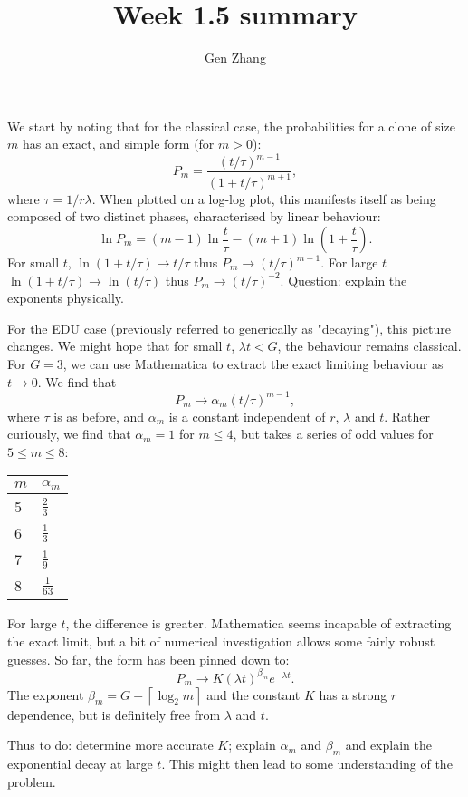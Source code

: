\documentclass[10pt,english]{article}
\begin{document}
\title{Week 1.5 summary}
\author{Gen Zhang}

\maketitle

We start by noting that for the classical case, the probabilities for a clone of size $m$ has an exact, and simple form (for $m>0$): $$ P_m = \frac{(t/\tau)^{m-1}}{(1+t/\tau)^{m+1}},$$ where $\tau = 1/r\lambda$. When plotted on a log-log plot, this manifests itself as being composed of two distinct phases, characterised by linear behaviour: $$\ln P_m = (m-1) \ln \frac{t}{\tau} - (m+1) \ln \left(1+\frac{t}{\tau} \right).$$ For small $t$, $\ln (1+t/\tau) \rightarrow t/\tau$ thus $P_m \rightarrow (t/\tau)^{m+1}$. For large $t$ $\ln (1+t/\tau) \rightarrow \ln (t/\tau)$ thus $P_m \rightarrow (t/\tau)^{-2}$. Question: explain the exponents physically.

For the EDU case (previously referred to generically as "decaying"), this picture changes. We might hope that for small $t$, $\lambda t < G$, the behaviour remains classical. For $G=3$, we can use Mathematica to extract the exact limiting behaviour as $t\rightarrow 0$. We find that $$ P_m \longrightarrow \alpha_m (t/\tau)^{m-1},$$ where $\tau$ is as before, and $\alpha_m$ is a constant independent of $r$, $\lambda$ and $t$. Rather curiously, we find that $\alpha_m = 1$ for $m \le 4$, but takes a series of odd values for $5 \le m \le 8$:

\begin{center}
	\begin{tabular}{ll}
		$m$ & $\alpha_m$ \\
		\hline
		5 & $\frac{2}{3}$ \\
		6 & $\frac{1}{3}$ \\
		7 & $\frac{1}{9}$ \\
		8 & $\frac{1}{63}$ \\
	\end{tabular}
	\label{tab:alpha_m}
\end{center}

For large $t$, the difference is greater. Mathematica seems incapable of extracting the exact limit, but a bit of numerical investigation allows some fairly robust guesses. So far, the form has been pinned down to: $$P_m \longrightarrow K (\lambda t)^{\beta_m} e^{-\lambda t}.$$ The exponent $\beta_m = G - \left\lceil\log_2 m \right\rceil$ and the constant $K$ has a strong $r$
dependence, but is definitely free from $\lambda$ and $t$.

Thus to do: determine more accurate $K$; explain $\alpha_m$ and $\beta_m$ and explain the exponential decay at large $t$. This might then lead to some understanding of the problem.
\end{document}
